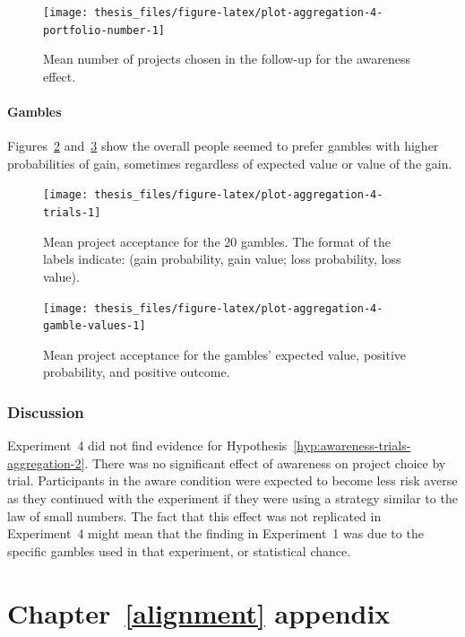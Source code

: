 \documentclass[a4paper, nobind, dvipsnames]{templates/ociamthesis}
\theoremstyle{definition}
\theoremstyle{definition}
\theoremstyle{definition}
\theoremstyle{definition}
\theoremstyle{remark}
\begin{document}
\begin{figure}
\texttt{[image: thesis\_files/figure-latex/plot-aggregation-4-portfolio-number-1]} \caption{Mean number of projects chosen in the follow-up for the awareness effect.}\label{fig:plot-aggregation-4-portfolio-number}
\end{figure}

\subsubsection{Gambles}

Figures~\ref{fig:plot-aggregation-4-trials}
and~\ref{fig:plot-aggregation-4-gamble-values} show the
overall people seemed to prefer gambles with higher probabilities of gain,
sometimes regardless of expected value or value of the gain.



\begin{figure}
\texttt{[image: thesis\_files/figure-latex/plot-aggregation-4-trials-1]} \caption{Mean project acceptance for the 20 gambles. The format of the labels indicate: (gain probability, gain value; loss probability, loss value).}\label{fig:plot-aggregation-4-trials}
\end{figure}



\begin{figure}
\texttt{[image: thesis\_files/figure-latex/plot-aggregation-4-gamble-values-1]} \caption{Mean project acceptance for the gambles' expected value, positive probability, and positive outcome.}\label{fig:plot-aggregation-4-gamble-values}
\end{figure}

\subsection{Discussion}

Experiment~4 did not find evidence for
Hypothesis~\ref{hyp:awareness-trials-aggregation-2}. There was no significant
effect of awareness on project choice by trial. Participants in the aware
condition were expected to become less risk averse as they continued with the
experiment if they were using a strategy similar to the law of small numbers.
The fact that this effect was not replicated in Experiment~4 might mean that the
finding in Experiment~1 was due to the specific gambles used in that experiment,
or statistical chance.

\hypertarget{alignment-appendix}{%
\chapter{Chapter~\ref{alignment} appendix}\label{alignment-appendix}}
\end{document}
